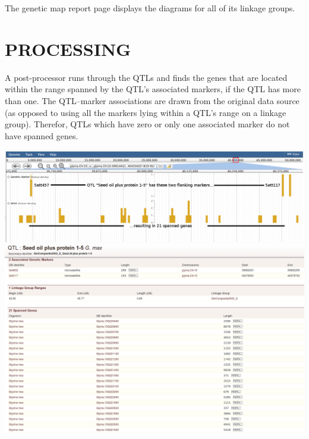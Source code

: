 \documentclass[]{pagposter}
\newlength{\figwidth}
\begin{document}
\begin{multicols*}{3}
  The genetic map report page displays the diagrams for all of its linkage groups.

  \section*{PROCESSING}

  A post-processor runs through the QTLs and finds the genes that are located within the range spanned by the QTL's associated markers, if the QTL has more than one. The QTL--marker associations
  are drawn from the original data source (as opposed to using all the markers lying within a QTL's range on a linkage group). Therefor, QTLs which have zero or only one associated marker do not have
  spanned genes.

  \begin{center}
    \includegraphics[width=\figwidth]{genetic-marker-jbrowse.png} %
    \vspace{24pt}
    \includegraphics[width=\figwidth]{QTL-report.png} %
  \end{center}


\end{multicols*}
\end{document}
